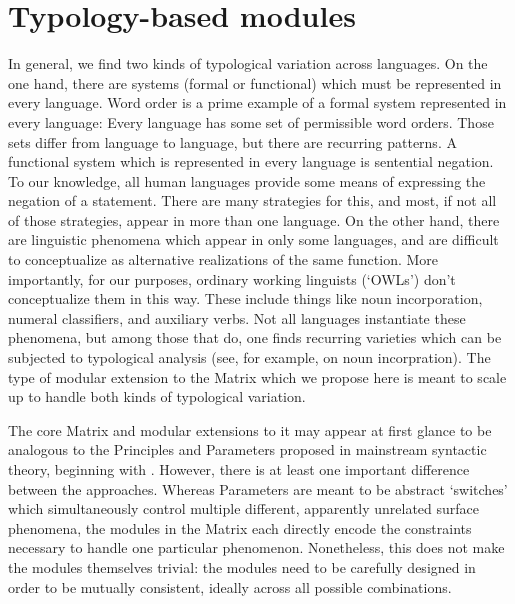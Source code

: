 \documentclass[11pt]{article}
\begin{document}
\section{Typology-based modules}

In general, we find two kinds of typological variation across
languages.  On the one hand, there are systems (formal or functional)
which must be represented in every language.  Word order is a prime
example of a formal system represented in every language: Every
language has some set of permissible word orders.  Those sets differ
from language to language, but there are recurring patterns.
A functional system which is represented in every language is
sentential negation.  To our knowledge, all human languages provide
some means of expressing the negation of a statement.  There are many
strategies for this, and most, if not all of those strategies, appear
in more than one language.  On the other hand, there are linguistic
phenomena which appear in only some languages, and are difficult to
conceptualize as alternative realizations of the same function.  More
importantly, for our purposes, ordinary working linguists (`OWLs')
don't conceptualize them in this way.  These include things like
noun incorporation, numeral classifiers, and auxiliary verbs.
Not all languages instantiate these phenomena, but among those that
do, one finds recurring varieties which can be subjected to typological
analysis (see, for example, \cite{Mithun:??} on noun incorpration).
The type of modular extension to the Matrix which we propose here
is meant to scale up to handle both kinds of typological variation.

The core Matrix and modular extensions to it may appear at first
glance to be analogous to the Principles and Parameters proposed
in mainstream syntactic theory, beginning with .
However, there is at least one important difference between the
approaches.  Whereas Parameters are meant to be abstract `switches'
which simultaneously control multiple different, apparently 
unrelated surface phenomena, the modules in the Matrix each directly
encode the constraints necessary to handle one particular phenomenon.
Nonetheless, this does not make the modules themselves trivial:
the modules need to be carefully designed in order to be mutually
consistent, ideally across all possible combinations.  
\end{document}
